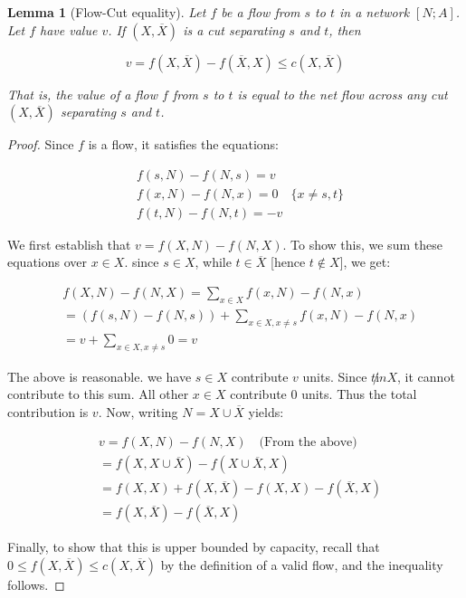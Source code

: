 \documentclass[titlepage]{article}
\newcommand{\Xbar}{\ensuremath{\overline{X}}}
\theoremstyle{plain}
\newtheorem{lemma}{Lemma}[theorem]
\theoremstyle{definition}
\theoremstyle{remark}
\begin{document}
\begin{lemma}[Flow-Cut equality]
    \label{lemma:flow-cut-equality}
    Let $f$ be a flow from $s$ to $t$ in a network $[N; A]$. Let $f$ have
    value $v$. If $(X, \Xbar)$ is a cut separating $s$ and $t$, then

\begin{equation}
    \tag{Flow-Cut equality}
    v = f(X, \Xbar) - f(\Xbar, X) \leq c(X, \Xbar) 
    \label{eqn:flow-cut-equality}
\end{equation}

That is, the value of a flow $f$ from $s$ to $t$ is equal to the net flow
across any cut $(X, \Xbar)$ separating $s$ and $t$.
\end{lemma}
\begin{proof}
Since $f$ is a flow, it satisfies the equations:

\begin{align*}
    &f(s, N) - f(N, s) = v \\
    &f(x, N) - f(N, x) = 0 \quad \{x \neq s, t\} \\
    &f(t, N) - f(N, t) = -v
\end{align*}

We first establish that $v = f(X, N) - f(N, X)$. To show this, we sum these
equations over $x \in X$. since $s \in X$, while $t \in \Xbar$ [hence $t \not \in X]$, we get:

\begin{align*}
    &f(X, N) - f(N, X) = \sum_{x \in X} f(x, N) - f(N, x)\\
    &= (f(s, N) - f(N, s)) + \sum_{x \in X, x \neq s} f(x, N) - f(N, x) \\
    &= v + \sum_{x \in X, x \neq s} 0 = v
\end{align*}

The above is reasonable. we have $s \in X$ contribute $v$ units. 
Since $t \not in X$, it cannot contribute to this sum. All other
$x \in X$ contribute $0$ units. Thus the total contribution is $v$.  Now, writing $N = X \cup \Xbar$ yields:

\begin{align*}
&v = f(X, N) - f(N, X) \quad \text{(From the above)} \\
&= f(X, X \cup \Xbar) - f(X \cup \Xbar, X) \\
&= f(X, X) + f(X, \Xbar) - f(X, X) - f(\Xbar, X) \\
&= f(X, \Xbar) - f(\Xbar, X)
\end{align*}

Finally, to show that this is upper bounded by capacity, recall that $0 \leq f(X, \Xbar) \leq c(X, \Xbar)$
by the definition of a valid flow, and the inequality follows.

\end{proof}
\end{document}
